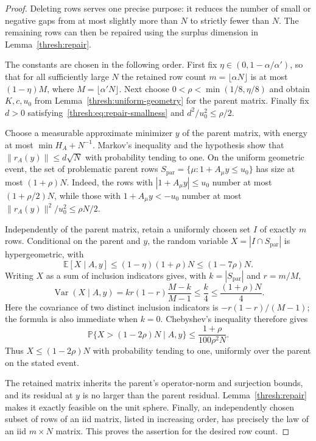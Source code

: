 \documentclass[11pt,a4paper]{article}
\numberwithin{equation}{section}
\theoremstyle{definition}
\theoremstyle{remark}
\newcommand{\E}{\mathbb E}
\newcommand{\Prob}{\mathbb P}
\DeclareMathOperator{\Var}{Var}
\begin{document}
\begin{proof}
Deleting rows serves one precise purpose: it reduces the number of
small or negative gaps from at most slightly more than $N$ to strictly
fewer than $N$.  The remaining rows can then be repaired using the
surplus dimension in Lemma~\ref{thresh:repair}.

The constants are chosen in the following order.  First fix
$\eta\in(0,1-\alpha/\alpha')$, so that for all sufficiently large $N$
the retained row count $m=\lfloor\alpha N\rfloor$ is at most
$(1-\eta)M$, where $M=\lfloor\alpha'N\rfloor$.  Next choose
$0<\rho<\min(1/8,\eta/8)$ and obtain $K,c,u_0$ from
Lemma~\ref{thresh:uniform-geometry} for the parent matrix.  Finally fix
$d>0$ satisfying~\eqref{thresh:eq:repair-smallness} and
$d^2/u_0^2\leq\rho/2$.

Choose a measurable approximate minimizer $y$ of the parent matrix,
with energy at most $\min H_A+N^{-1}$.  Markov's inequality and the
hypothesis show that $\|r_A(y)\|\leq d\sqrt N$ with probability tending
to one.  On the uniform geometric event, the set of problematic parent
rows
$S_{\mathrm{par}}=\{\mu:1+A_\mu y\leq u_0\}$ has size at most
$(1+\rho)N$.  Indeed, the rows with $|1+A_\mu y|\leq u_0$ number at most
$(1+\rho/2)N$, while those with $1+A_\mu y<-u_0$ number at most
$\|r_A(y)\|^2/u_0^2\leq\rho N/2$.

Independently of the parent matrix, retain a uniformly chosen set
$I$ of exactly $m$ rows.  Conditional on the parent and $y$, the random
variable $X=|I\cap S_{\mathrm{par}}|$ is hypergeometric, with
\[
 \E[X\mid A,y]\leq(1-\eta)(1+\rho)N\leq(1-7\rho)N.
\]
Writing $X$ as a sum of inclusion indicators gives, with
$k=|S_{\mathrm{par}}|$ and $r=m/M$,
\[
 \Var(X\mid A,y)=kr(1-r)\frac{M-k}{M-1}\leq\frac{k}{4}
                  \leq\frac{(1+\rho)N}{4}.
\]
Here the covariance of two distinct inclusion indicators is
$-r(1-r)/(M-1)$; the formula is also immediate when $k=0$.
Chebyshev's inequality therefore gives
\[
 \Prob\{X>(1-2\rho)N\mid A,y\}
 \leq\frac{1+\rho}{100\rho^2N}.
\]
Thus $X\leq(1-2\rho)N$ with probability tending to one, uniformly over
the parent on the stated event.

The retained matrix inherits the parent's operator-norm and
surjection bounds, and its residual at $y$ is no larger than the
parent residual.  Lemma~\ref{thresh:repair} makes it exactly feasible
on the unit sphere.  Finally, an independently chosen subset of rows
of an iid matrix, listed in increasing order, has precisely the law
of an iid $m\times N$ matrix.  This proves the assertion for the desired
row count.
\end{proof}
\end{document}
